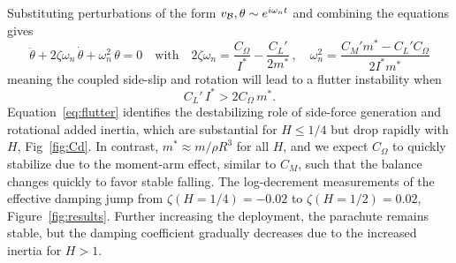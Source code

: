 \documentclass[lineno]{JFM-FLM_Au}
\begin{document}
Substituting perturbations of the form $v_{\cal B},\theta\sim e^{i\omega_n t}$ and combining the equations gives
\begin{equation}
    \ddot\theta + 2\zeta\omega_n\,\dot\theta+\omega_n^2\,\theta = 0 \quad\text{with}\quad 2\zeta\omega_n=\frac{C_\Omega}{I^*}- \frac{C_L'}{2m^*}\,,\quad \omega_n^2=\frac{C_M'm^*-C_L'C_\Omega}{2I^*m^*}
\end{equation}
meaning the coupled side-slip and rotation will lead to a flutter instability when
\begin{equation}
    C_L'\,I^* > 2C_\Omega\, m^*. \label{eq:flutter}
\end{equation}
Equation~\ref{eq:flutter} identifies the destabilizing role of side-force generation and rotational added inertia, which are substantial for $H\le1/4$ but drop rapidly with $H$, Fig~\ref{fig:Cd}. In contrast, $m^*\approx m/\rho R^3$ for all $H$, and we expect $C_\Omega$ to quickly stabilize due to the moment-arm effect, similar to $C_M$, such that the balance changes quickly to favor stable falling. The log-decrement measurements of the effective damping jump from $\zeta(H=1/4)=-0.02$ to $\zeta(H=1/2)=0.02$, Figure~\ref{fig:results}. Further increasing the deployment, the parachute remains stable, but the damping coefficient gradually decreases due to the increased inertia for $H>1$.
\end{document}
